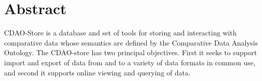 \section{Abstract}
CDAO-Store is a database and set of tools for storing and interacting with comparative data
whose semantics are defined by the Comparative Data Analysis Ontology. The CDAO-store has two
principal objectives. First it seeks to support import and export of data from and to a variety
of data formats in common use, and second it supports online viewing and querying of data.


